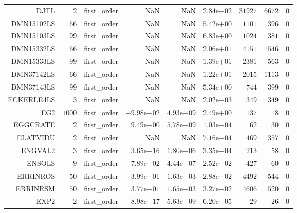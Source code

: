\begin{longtable}{rrrrrrrrr}
DJTL & \(     2\) & first\_order &       NaN &       NaN & \( 2.84\)e\(-02\) & \( 31927\) & \(  6672\) & \(     0\) \\
DMN15102LS & \(    66\) & first\_order &       NaN &       NaN & \( 5.42\)e\(+00\) & \(  1101\) & \(   396\) & \(     0\) \\
DMN15103LS & \(    99\) & first\_order &       NaN &       NaN & \( 6.83\)e\(+00\) & \(  1024\) & \(   381\) & \(     0\) \\
DMN15332LS & \(    66\) & first\_order &       NaN &       NaN & \( 2.06\)e\(+01\) & \(  4151\) & \(  1546\) & \(     0\) \\
DMN15333LS & \(    99\) & first\_order &       NaN &       NaN & \( 1.39\)e\(+01\) & \(  2381\) & \(   563\) & \(     0\) \\
DMN37142LS & \(    66\) & first\_order &       NaN &       NaN & \( 1.22\)e\(+01\) & \(  2015\) & \(  1113\) & \(     0\) \\
DMN37143LS & \(    99\) & first\_order &       NaN &       NaN & \( 5.34\)e\(+00\) & \(   744\) & \(   399\) & \(     0\) \\
ECKERLE4LS & \(     3\) & first\_order &       NaN &       NaN & \( 2.02\)e\(-03\) & \(   349\) & \(   349\) & \(     0\) \\
EG2 & \(  1000\) & first\_order & \(-9.98\)e\(+02\) & \( 4.93\)e\(-09\) & \( 2.49\)e\(+00\) & \(   137\) & \(    18\) & \(     0\) \\
EGGCRATE & \(     2\) & first\_order & \( 9.49\)e\(+00\) & \( 5.78\)e\(-09\) & \( 1.03\)e\(-04\) & \(    62\) & \(    30\) & \(     0\) \\
ELATVIDU & \(     2\) & first\_order &       NaN &       NaN & \( 7.16\)e\(-04\) & \(   469\) & \(   357\) & \(     0\) \\
ENGVAL2 & \(     3\) & first\_order & \( 3.65\)e\(-16\) & \( 1.80\)e\(-06\) & \( 3.35\)e\(-04\) & \(   213\) & \(    58\) & \(     0\) \\
ENSOLS & \(     9\) & first\_order & \( 7.89\)e\(+02\) & \( 4.44\)e\(-07\) & \( 2.52\)e\(-02\) & \(   427\) & \(    60\) & \(     0\) \\
ERRINROS & \(    50\) & first\_order & \( 3.99\)e\(+01\) & \( 1.63\)e\(-03\) & \( 2.88\)e\(-02\) & \(  4492\) & \(   544\) & \(     0\) \\
ERRINRSM & \(    50\) & first\_order & \( 3.77\)e\(+01\) & \( 1.65\)e\(-03\) & \( 3.27\)e\(-02\) & \(  4606\) & \(   520\) & \(     0\) \\
EXP2 & \(     2\) & first\_order & \( 8.98\)e\(-17\) & \( 5.63\)e\(-09\) & \( 6.20\)e\(-05\) & \(    29\) & \(    26\) & \(     0\) \\

\end{longtable}
